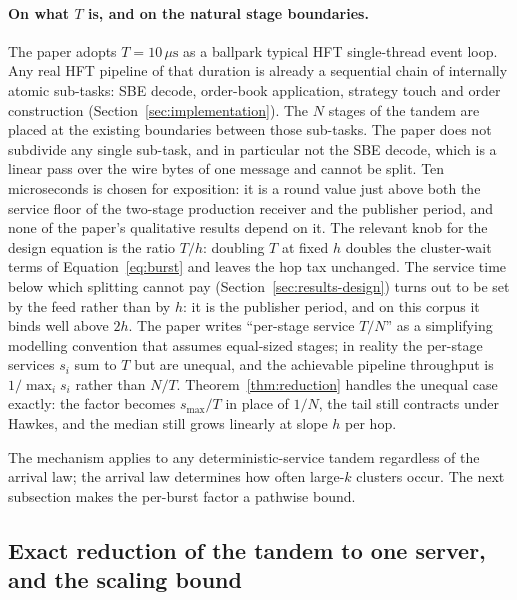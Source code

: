 \documentclass[11pt]{article}
\begin{document}
\paragraph{On what $T$ is, and on the natural stage boundaries.} The paper adopts $T =
10\,\mu\mathrm{s}$ as a ballpark typical HFT single-thread event loop. Any real HFT pipeline of that duration is already a sequential chain of internally
atomic sub-tasks: SBE decode, order-book application, strategy touch and order
construction (Section~\ref{sec:implementation}). The $N$ stages of the tandem are placed at
the existing boundaries between those sub-tasks. The paper does not subdivide any single
sub-task, and in particular not the SBE decode, which is a linear pass over the wire bytes
of one message and cannot be split. Ten microseconds is chosen for exposition: it is a round value just above both the
service floor of the two-stage production receiver and the publisher period, and none of the paper's qualitative
results depend on it. The
relevant knob for the design equation is the ratio $T/h$: doubling $T$ at fixed $h$
doubles the cluster-wait terms of Equation~\eqref{eq:burst} and leaves the hop tax
unchanged. The service time below which splitting cannot pay
(Section~\ref{sec:results-design}) turns out to be set by the feed rather than by $h$: it
is the publisher period, and on this corpus it binds well above $2h$. The paper writes ``per-stage
service $T/N$'' as a simplifying modelling convention that assumes equal-sized stages; in
reality the per-stage services $s_i$ sum to $T$ but are unequal, and the achievable
pipeline throughput is $1/\max_i s_i$ rather than $N/T$. Theorem~\ref{thm:reduction}
handles the unequal case exactly: the factor becomes $s_{\max}/T$ in place of $1/N$, the
tail still contracts under Hawkes, and the median still grows linearly at slope $h$ per
hop.

The mechanism applies to any deterministic-service tandem regardless of the arrival
law; the arrival law determines how often large-$k$ clusters occur. The next subsection
makes the per-burst factor a pathwise bound.

\subsection{Exact reduction of the tandem to one server, and the scaling bound}
\label{sec:theory-cluster}
\end{document}
